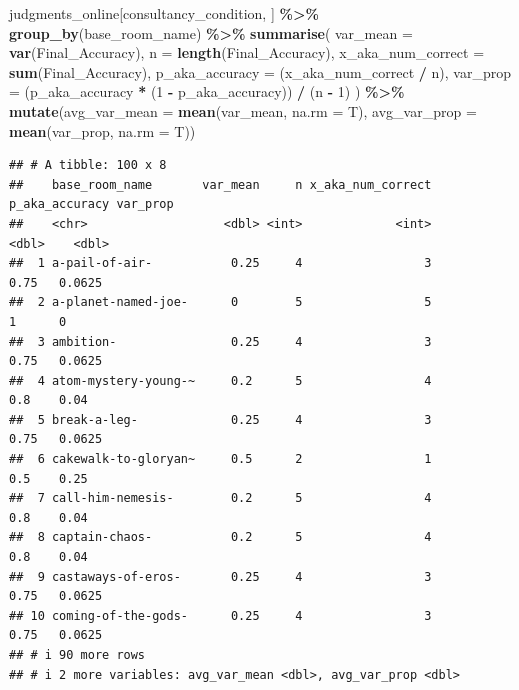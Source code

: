 \documentclass[
]{article}
\newenvironment{Shaded}{\begin{snugshade}}{\end{snugshade}}
\newcommand{\AttributeTok}[1]{\textcolor[rgb]{0.13,0.29,0.53}{#1}}
\newcommand{\DecValTok}[1]{\textcolor[rgb]{0.00,0.00,0.81}{#1}}
\newcommand{\FunctionTok}[1]{\textcolor[rgb]{0.13,0.29,0.53}{\textbf{#1}}}
\newcommand{\NormalTok}[1]{#1}
\newcommand{\SpecialCharTok}[1]{\textcolor[rgb]{0.81,0.36,0.00}{\textbf{#1}}}
\begin{document}
\begin{Shaded}
\begin{Highlighting}[]
\NormalTok{judgments\_online[consultancy\_condition, ] }\SpecialCharTok{\%\textgreater{}\%}
  \FunctionTok{group\_by}\NormalTok{(base\_room\_name) }\SpecialCharTok{\%\textgreater{}\%}
  \FunctionTok{summarise}\NormalTok{(}
    \AttributeTok{var\_mean =} \FunctionTok{var}\NormalTok{(Final\_Accuracy),}
    \AttributeTok{n =} \FunctionTok{length}\NormalTok{(Final\_Accuracy),}
    \AttributeTok{x\_aka\_num\_correct =} \FunctionTok{sum}\NormalTok{(Final\_Accuracy),}
    \AttributeTok{p\_aka\_accuracy =}\NormalTok{ (x\_aka\_num\_correct }\SpecialCharTok{/}\NormalTok{ n),}
    \AttributeTok{var\_prop =}\NormalTok{ (p\_aka\_accuracy }\SpecialCharTok{*}\NormalTok{ (}\DecValTok{1} \SpecialCharTok{{-}}\NormalTok{ p\_aka\_accuracy)) }\SpecialCharTok{/}\NormalTok{ (n }\SpecialCharTok{{-}} \DecValTok{1}\NormalTok{)}
\NormalTok{  ) }\SpecialCharTok{\%\textgreater{}\%} \FunctionTok{mutate}\NormalTok{(}\AttributeTok{avg\_var\_mean =} \FunctionTok{mean}\NormalTok{(var\_mean, }\AttributeTok{na.rm =}\NormalTok{ T),}
               \AttributeTok{avg\_var\_prop =} \FunctionTok{mean}\NormalTok{(var\_prop, }\AttributeTok{na.rm =}\NormalTok{ T))}
\end{Highlighting}
\end{Shaded}

\begin{verbatim}
## # A tibble: 100 x 8
##    base_room_name       var_mean     n x_aka_num_correct p_aka_accuracy var_prop
##    <chr>                   <dbl> <int>             <int>          <dbl>    <dbl>
##  1 a-pail-of-air-           0.25     4                 3           0.75   0.0625
##  2 a-planet-named-joe-      0        5                 5           1      0     
##  3 ambition-                0.25     4                 3           0.75   0.0625
##  4 atom-mystery-young-~     0.2      5                 4           0.8    0.04  
##  5 break-a-leg-             0.25     4                 3           0.75   0.0625
##  6 cakewalk-to-gloryan~     0.5      2                 1           0.5    0.25  
##  7 call-him-nemesis-        0.2      5                 4           0.8    0.04  
##  8 captain-chaos-           0.2      5                 4           0.8    0.04  
##  9 castaways-of-eros-       0.25     4                 3           0.75   0.0625
## 10 coming-of-the-gods-      0.25     4                 3           0.75   0.0625
## # i 90 more rows
## # i 2 more variables: avg_var_mean <dbl>, avg_var_prop <dbl>
\end{verbatim}
\end{document}
